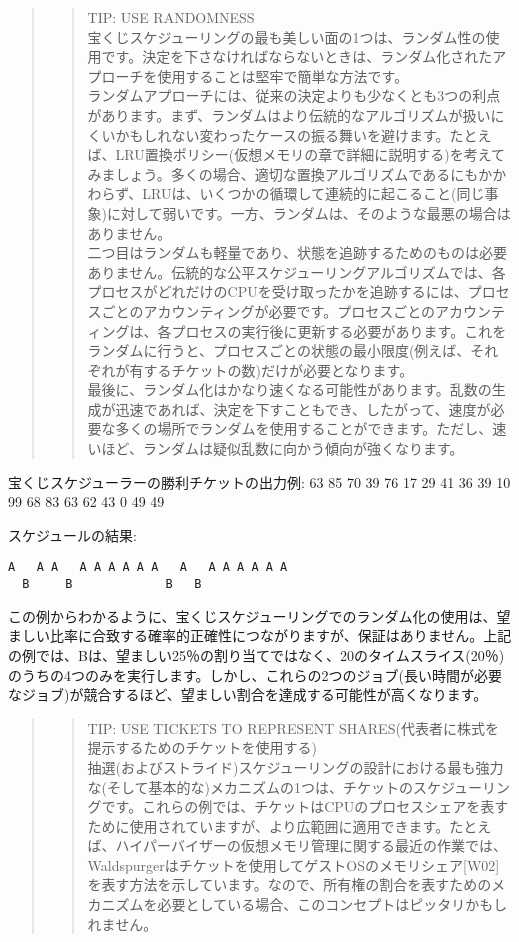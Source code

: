 \begin{quote}
\begin{quote}
TIP: USE RANDOMNESS\\
宝くじスケジューリングの最も美しい面の1つは、ランダム性の使用です。決定を下さなければならないときは、ランダム化されたアプローチを使用することは堅牢で簡単な方法です。\\
ランダムアプローチには、従来の決定よりも少なくとも3つの利点があります。まず、ランダムはより伝統的なアルゴリズムが扱いにくいかもしれない変わったケースの振る舞いを避けます。たとえば、LRU置換ポリシー(仮想メモリの章で詳細に説明する)を考えてみましょう。多くの場合、適切な置換アルゴリズムであるにもかかわらず、LRUは、いくつかの循環して連続的に起こること(同じ事象)に対して弱いです。一方、ランダムは、そのような最悪の場合はありません。\\
二つ目はランダムも軽量であり、状態を追跡するためのものは必要ありません。伝統的な公平スケジューリングアルゴリズムでは、各プロセスがどれだけのCPUを受け取ったかを追跡するには、プロセスごとのアカウンティングが必要です。プロセスごとのアカウンティングは、各プロセスの実行後に更新する必要があります。これをランダムに行うと、プロセスごとの状態の最小限度(例えば、それぞれが有するチケットの数)だけが必要となります。\\
最後に、ランダム化はかなり速くなる可能性があります。乱数の生成が迅速であれば、決定を下すこともでき、したがって、速度が必要な多くの場所でランダムを使用することができます。ただし、速いほど、ランダムは疑似乱数に向かう傾向が強くなります。
\end{quote}
\end{quote}

宝くじスケジューラーの勝利チケットの出力例: 63 85 70 39 76 17 29 41 36
39 10 99 68 83 63 62 43 0 49 49

スケジュールの結果:

\begin{verbatim}
A   A A   A A A A A A   A   A A A A A A
  B     B             B   B
\end{verbatim}

この例からわかるように、宝くじスケジューリングでのランダム化の使用は、望ましい比率に合致する確率的正確性につながりますが、保証はありません。上記の例では、Bは、望ましい25％の割り当てではなく、20のタイムスライス(20％)のうちの4つのみを実行します。しかし、これらの2つのジョブ(長い時間が必要なジョブ)が競合するほど、望ましい割合を達成する可能性が高くなります。

\begin{quote}
\begin{quote}
TIP: USE TICKETS TO REPRESENT
SHARES(代表者に株式を提示するためのチケットを使用する)\\
抽選(およびストライド)スケジューリングの設計における最も強力な(そして基本的な)メカニズムの1つは、チケットのスケジューリングです。これらの例では、チケットはCPUのプロセスシェアを表すために使用されていますが、より広範囲に適用できます。たとえば、ハイパーバイザーの仮想メモリ管理に関する最近の作業では、Waldspurgerはチケットを使用してゲストOSのメモリシェア{[}W02{]}を表す方法を示しています。なので、所有権の割合を表すためのメカニズムを必要としている場合、このコンセプトはピッタリかもしれません。
\end{quote}
\end{quote}


